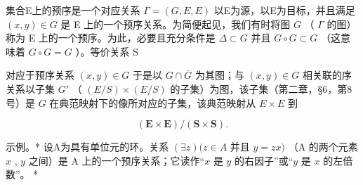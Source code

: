集合E上的预序是一个对应关系 \(\Gamma = (G, E, E)\) 以E为源，以E为目标，并且满足 \((x, y) \in G\) 是 E 上的一个预序关系。为简便起见，我们有时将图 \(G\) （ \(\Gamma\) 的图）称为 E 上的一个预序。为此，必要且充分条件是 \(\Delta \subset G\) 并且 \(G \circ G \subset G\) （这意味着 \(G \circ G = G\) ）。等价关系 S

对应于预序关系 \((x, y) \in G\) 于是以 \(G \cap \overline{G}\) 为其图；与 \((x, y) \in G\) 相关联的序关系以子集 \(G'\) （ \((E/S) \times (E/S)\) 的子集）为图，该子集（第二章，§6，第8号）是 \(G\) 在典范映射下的像所对应的子集，该典范映射从 \(E \times E\) 到

\[
(\mathbf {E} \times \mathbf {E}) / (\mathbf {S} \times \mathbf {S}).
\]

示例。* 设A为具有单位元的环。关系 \((\exists z)(z \in A\) 并且 \(y = zx)\) （A 的两个元素 \(x\) , \(y\) 之间）是 A 上的一个预序关系；它读作“\(x\) 是 \(y\) 的右因子”或“\(y\) 是 \(x\) 的左倍数”。 *

